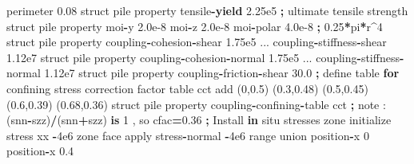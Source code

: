\documentclass[a4paper, nobind]{templates/ociamthesis}
\newenvironment{Shaded}{\begin{snugshade}}{\end{snugshade}}
\newcommand{\BuiltInTok}[1]{#1}
\newcommand{\ControlFlowTok}[1]{\textcolor[rgb]{0.13,0.29,0.53}{\textbf{#1}}}
\newcommand{\DecValTok}[1]{\textcolor[rgb]{0.00,0.00,0.81}{#1}}
\newcommand{\FloatTok}[1]{\textcolor[rgb]{0.00,0.00,0.81}{#1}}
\newcommand{\KeywordTok}[1]{\textcolor[rgb]{0.13,0.29,0.53}{\textbf{#1}}}
\newcommand{\NormalTok}[1]{#1}
\newcommand{\OperatorTok}[1]{\textcolor[rgb]{0.81,0.36,0.00}{\textbf{#1}}}
\newcommand{\StringTok}[1]{\textcolor[rgb]{0.31,0.60,0.02}{#1}}
\renewenvironment{Shaded}
{
  \vspace{10pt}%
  \begin{snugshade}%
}{%
  \end{snugshade}%
  \vspace{8pt}%
}
\begin{document}
\begin{Shaded}
\begin{Highlighting}[]
\NormalTok{                         perimeter }\FloatTok{0.08}
\NormalTok{    struct pile }\BuiltInTok{property}\NormalTok{ tensile}\OperatorTok{{-}}\ControlFlowTok{yield}   \FloatTok{2.25e5}  \OperatorTok{;}\NormalTok{ ultimate tensile strength}
\NormalTok{    struct pile }\BuiltInTok{property}\NormalTok{ moi}\OperatorTok{{-}}\NormalTok{y }\FloatTok{2.0e{-}8}\NormalTok{ moi}\OperatorTok{{-}}\NormalTok{z }\FloatTok{2.0e{-}8}\NormalTok{ moi}\OperatorTok{{-}}\NormalTok{polar }\FloatTok{4.0e{-}8} \OperatorTok{;} \FloatTok{0.25}\OperatorTok{*}\NormalTok{pi}\OperatorTok{*}\NormalTok{r}\OperatorTok{\^{}}\DecValTok{4}
\NormalTok{    struct pile }\BuiltInTok{property}\NormalTok{ coupling}\OperatorTok{{-}}\NormalTok{cohesion}\OperatorTok{{-}}\NormalTok{shear }\FloatTok{1.75e5}\NormalTok{ ...}
\NormalTok{                         coupling}\OperatorTok{{-}}\NormalTok{stiffness}\OperatorTok{{-}}\NormalTok{shear }\FloatTok{1.12e7}
\NormalTok{    struct pile }\BuiltInTok{property}\NormalTok{ coupling}\OperatorTok{{-}}\NormalTok{cohesion}\OperatorTok{{-}}\NormalTok{normal }\FloatTok{1.75e5}\NormalTok{ ...}
\NormalTok{                         coupling}\OperatorTok{{-}}\NormalTok{stiffness}\OperatorTok{{-}}\NormalTok{normal }\FloatTok{1.12e7}
\NormalTok{    struct pile }\BuiltInTok{property}\NormalTok{ coupling}\OperatorTok{{-}}\NormalTok{friction}\OperatorTok{{-}}\NormalTok{shear }\FloatTok{30.0}
    \OperatorTok{;}\NormalTok{ define table }\ControlFlowTok{for}\NormalTok{ confining stress correction factor}
\NormalTok{    table }\StringTok{\textquotesingle{}cct\textquotesingle{}}\NormalTok{ add (}\DecValTok{0}\NormalTok{,}\FloatTok{0.5}\NormalTok{) (}\FloatTok{0.3}\NormalTok{,}\FloatTok{0.48}\NormalTok{) (}\FloatTok{0.5}\NormalTok{,}\FloatTok{0.45}\NormalTok{) (}\FloatTok{0.6}\NormalTok{,}\FloatTok{0.39}\NormalTok{) (}\FloatTok{0.68}\NormalTok{,}\FloatTok{0.36}\NormalTok{)}
\NormalTok{    struct pile }\BuiltInTok{property}\NormalTok{ coupling}\OperatorTok{{-}}\NormalTok{confining}\OperatorTok{{-}}\NormalTok{table }\StringTok{\textquotesingle{}cct\textquotesingle{}}
    \OperatorTok{;}\NormalTok{ note : (snn}\OperatorTok{{-}}\NormalTok{szz)}\OperatorTok{/}\NormalTok{(snn}\OperatorTok{+}\NormalTok{szz) }\KeywordTok{is} \DecValTok{1}\NormalTok{ , so cfac}\OperatorTok{=}\FloatTok{0.36}
    \OperatorTok{;}\NormalTok{ Install }\KeywordTok{in}\NormalTok{ situ stresses}
\NormalTok{    zone initialize stress xx }\OperatorTok{{-}}\FloatTok{4e6}
\NormalTok{    zone face }\BuiltInTok{apply}\NormalTok{ stress}\OperatorTok{{-}}\NormalTok{normal }\OperatorTok{{-}}\FloatTok{4e6} \BuiltInTok{range}\NormalTok{ union position}\OperatorTok{{-}}\NormalTok{x }\DecValTok{0}\NormalTok{ position}\OperatorTok{{-}}\NormalTok{x }\FloatTok{0.4} 

\end{Highlighting}
\end{Shaded}
\end{document}
